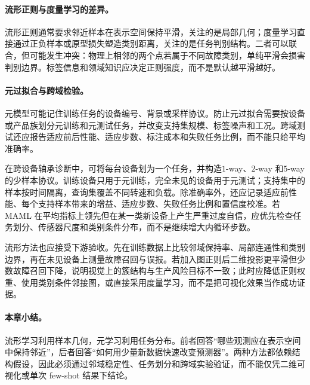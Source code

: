 \paragraph{流形正则与度量学习的差异。}
流形正则通常要求邻近样本在表示空间保持平滑，关注的是局部几何；度量学习直接通过正负样本或原型损失塑造类别距离，关注的是任务判别结构。二者可以联合，但可能发生冲突：物理上相邻的两个点若属于不同故障类别，单纯平滑会损害判别边界。标签信息和领域知识应决定正则强度，而不是默认越平滑越好。

\paragraph{元过拟合与跨域检验。}
元模型可能记住训练任务的设备编号、背景或采样协议。防止元过拟合需要按设备或产品族划分元训练和元测试任务，并改变支持集规模、标签噪声和工况。跨域测试还应报告适应前后性能、适应步数、标注成本和失败任务比例，而不能只给平均准确率。

在跨设备轴承诊断中，可将每台设备划为一个任务，并构造$1$-way、$2$-way 和$5$-way的少样本协议。训练设备只用于元训练，完全未见的设备用于元测试；支持集中的样本按时间隔离，查询集覆盖不同转速和负载。除准确率外，还应记录适应前性能、每个支持样本带来的增益、适应步数、失败任务比例和置信度校准。若 MAML 在平均指标上领先但在某一类新设备上产生严重过度自信，应优先检查任务划分、传感器尺度和类别条件分布，而不是继续增大内循环步数。

流形方法也应接受下游验收。先在训练数据上比较邻域保持率、局部连通性和类别边界，再在未见设备上测量故障召回与误报。若加入图正则后二维投影更平滑但少数故障召回下降，说明视觉上的簇结构与生产风险目标不一致；此时应降低正则权重、使用类别条件邻接图，或直接采用度量学习，而不是把可视化效果当作成功证据。

\paragraph{本章小结。}
流形学习利用样本几何，元学习利用任务分布。前者回答“哪些观测应在表示空间中保持邻近”，后者回答“如何用少量新数据快速改变预测器”。两种方法都依赖结构假设，因此必须通过邻域稳定性、任务划分和跨域实验验证，而不能仅凭二维可视化或单次 few-shot 结果下结论。